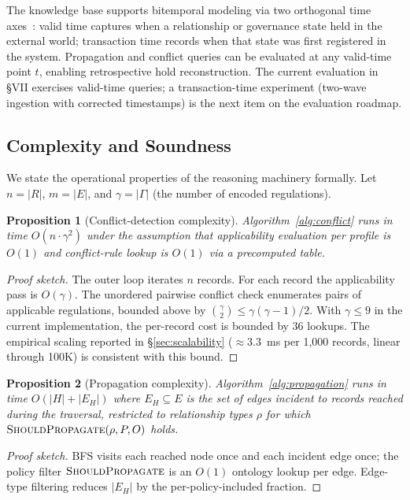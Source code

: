 \documentclass{ieeeaccess}
\newtheorem{proposition}{Proposition}
\begin{document}
The knowledge base supports bitemporal modeling via two orthogonal time axes~\cite{snodgrass1995,jensen1997}: valid time captures when a relationship or governance state held in the external world; transaction time records when that state was first registered in the system. Propagation and conflict queries can be evaluated at any valid-time point $t$, enabling retrospective hold reconstruction. The current evaluation in §VII exercises valid-time queries; a transaction-time experiment (two-wave ingestion with corrected timestamps) is the next item on the evaluation roadmap.

\subsection{Complexity and Soundness}

We state the operational properties of the reasoning machinery formally. Let $n = |R|$, $m = |E|$, and $\gamma = |\Gamma|$ (the number of encoded regulations).

\begin{proposition}[Conflict-detection complexity]
Algorithm~\ref{alg:conflict} runs in time $O(n \cdot \gamma^2)$ under the assumption that applicability evaluation per profile is $O(1)$ and conflict-rule lookup is $O(1)$ via a precomputed table.
\end{proposition}

\begin{proof}[Proof sketch]
The outer loop iterates $n$ records. For each record the applicability pass is $O(\gamma)$. The unordered pairwise conflict check enumerates pairs of applicable regulations, bounded above by $\binom{\gamma}{2} \leq \gamma(\gamma-1)/2$. With $\gamma \leq 9$ in the current implementation, the per-record cost is bounded by 36 lookups. The empirical scaling reported in §\ref{sec:scalability} ($\approx 3.3$~ms per 1{,}000 records, linear through 100K) is consistent with this bound.
\end{proof}

\begin{proposition}[Propagation complexity]
Algorithm~\ref{alg:propagation} runs in time $O(|H| + |E_H|)$ where $E_H \subseteq E$ is the set of edges incident to records reached during the traversal, restricted to relationship types $\rho$ for which $\textsc{ShouldPropagate}(\rho, P, O)$ holds.
\end{proposition}

\begin{proof}[Proof sketch]
BFS visits each reached node once and each incident edge once; the policy filter $\textsc{ShouldPropagate}$ is an $O(1)$ ontology lookup per edge. Edge-type filtering reduces $|E_H|$ by the per-policy-included fraction.
\end{proof}
\end{document}
